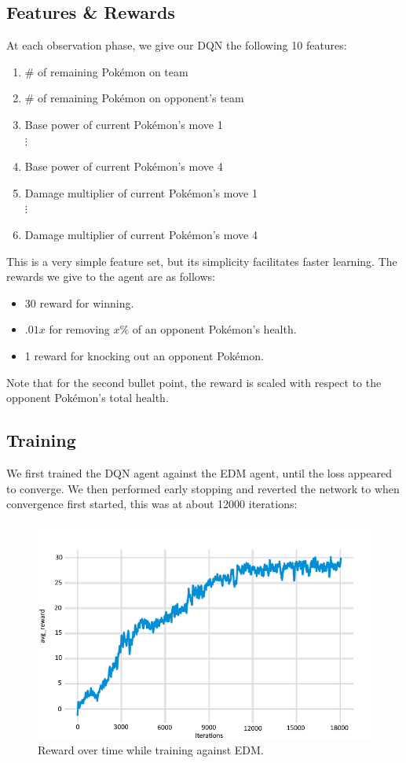 \documentclass{article}
\begin{document}
\subsection{Features \& Rewards}
At each observation phase, we give our DQN the following 10 features:
\begin{enumerate}
  \item \# of remaining Pokémon on team
  \item \# of remaining Pokémon on opponent's team
  \item Base power of current Pokémon's move 1\\\setcounter{enumi}{5}
  $\vdots$
  \item Base power of current Pokémon's move 4
  \item Damage multiplier of current Pokémon's move 1\\\setcounter{enumi}{9}
  $\vdots$
  \item Damage multiplier of current Pokémon's move 4
\end{enumerate}

This is a very simple feature set, but its simplicity facilitates faster learning. The rewards we give to the agent are as follows:
\begin{itemize}
  \item 30 reward for winning.
  \item $.01x$ for removing $x$\% of an opponent Pokémon's health.
  \item 1 reward for knocking out an opponent Pokémon.
\end{itemize}

Note that for the second bullet point, the reward is scaled with respect to the opponent Pokémon's total health. 

\subsection{Training}
We first trained the DQN agent against the EDM agent, until the loss appeared to converge. We then performed early stopping and reverted the network to when convergence first started, this was at about 12000 iterations:

\begin{figure}[H]
  \centering
  \includegraphics[scale=.7]{training.png}
  \caption{Reward over time while training against EDM.}
\end{figure}
\end{document}
